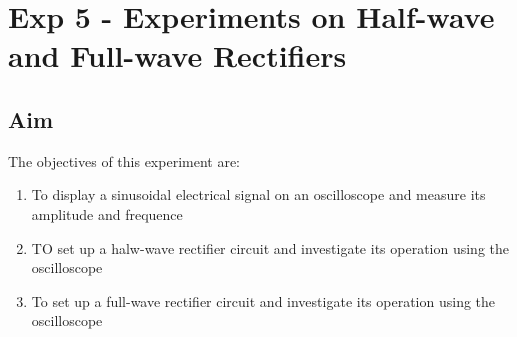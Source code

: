 \documentclass[a4paper]{article}
\begin{document}
\section{Exp 5 - Experiments on Half-wave and Full-wave Rectifiers}

\subsection{Aim}

The objectives of this experiment are:

\begin{enumerate}
    \item To display a sinusoidal electrical signal on an oscilloscope and measure its amplitude and frequence
    \item TO set up a halw-wave rectifier circuit and investigate its operation using the oscilloscope
    \item To set up a full-wave rectifier circuit and investigate its operation using the oscilloscope
\end{enumerate}
\end{document}
